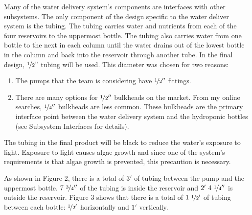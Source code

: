 \documentclass[12pt]{article}
\begin{document}
Many of the water delivery system's components are interfaces with other subsystems. The only
component of the design specific to the water deliver system is the tubing. The tubing carries water
and nutrients from each of the four reservoirs to the uppermost bottle. The tubing also carries
water from one bottle to the next in each column until the water drains out of the lowest bottle in
the column and back into the reservoir through another tube. In the final design, $\nicefrac{1}{2}"$
tubing will be used. This diameter was chosen for two reasons:

\begin{enumerate}

    \item The pumps that the team is considering have $\nicefrac{1}{2}''$ fittings.

    \item There are many options for $\nicefrac{1}{2}''$ bulkheads on the market. From my online
        searches, $\nicefrac{1}{4}''$ bulkheads are less common. These bulkheads are the primary
        interface point between the water delivery system and the hydroponic bottles (see Subsystem
        Interfaces for details).

\end{enumerate}


The tubing in the final product will be black to reduce the water's exposure to light. Exposure to
light causes algae growth \cite{doe-washington} and since one of the system's requirements is that
algae growth is prevented, this precaution is necessary.

As shown in Figure 2, there is a total of $3'$ of tubing between the pump and the uppermost bottle.
$7\ \nicefrac{3}{4}''$ of the tubing is inside the reservoir and $2'\ 4\ \nicefrac{1}{4}''$ is
outside the reservoir. Figure 3 shows that there is a total of $1\ \nicefrac{1}{2}'$ of tubing
between each bottle: $\nicefrac{1}{2}'$ horizontally and $1'$ vertically.
\end{document}

